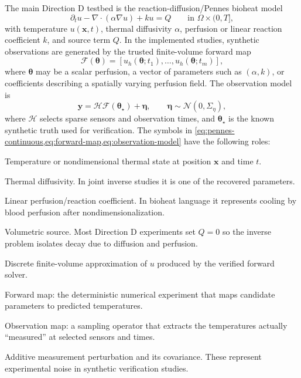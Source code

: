 \documentclass[11pt]{article}
\numberwithin{equation}{section}
\begin{document}
The main Direction D testbed is the reaction-diffusion/Pennes bioheat model
\begin{equation}
  \partial_t u - \nabla\cdot(\alpha\nabla u) + k u = Q
  \qquad \text{in } \Omega\times(0,T],
  \label{eq:pennes-continuous}
\end{equation}
with temperature $u(\bm{x},t)$, thermal diffusivity $\alpha$, perfusion or
linear reaction coefficient $k$, and source term $Q$.  In the implemented
studies, synthetic observations are generated by the trusted finite-volume
forward map
\begin{equation}
  \mathcal{F}(\bm{\theta}) =
  \left[u_h(\bm{\theta};t_1), \ldots, u_h(\bm{\theta};t_m)\right],
  \label{eq:forward-map}
\end{equation}
where $\bm{\theta}$ may be a scalar perfusion, a vector of parameters such as
$(\alpha,k)$, or coefficients describing a spatially varying perfusion field.
The observation model is
\begin{equation}
  \bm{y} = \mathcal{H}\mathcal{F}(\bm{\theta}_\star) + \bm{\eta},
  \qquad
  \bm{\eta}\sim \mathcal{N}(0,\Sigma_\eta),
  \label{eq:observation-model}
\end{equation}
where $\mathcal{H}$ selects sparse sensors and observation times, and
$\bm{\theta}_\star$ is the known synthetic truth used for verification.
The symbols in \cref{eq:pennes-continuous,eq:forward-map,eq:observation-model}
have the following roles:
\begin{description}[leftmargin=2.8cm,style=nextline]
  \item[$u(\bm{x},t)$] Temperature or nondimensional thermal state at position
  $\bm{x}$ and time $t$.
  \item[$\alpha$] Thermal diffusivity.  In joint inverse studies it is one of
  the recovered parameters.
  \item[$k$] Linear perfusion/reaction coefficient.  In bioheat language it
  represents cooling by blood perfusion after nondimensionalization.
  \item[$Q$] Volumetric source.  Most Direction D experiments set $Q=0$ so the
  inverse problem isolates decay due to diffusion and perfusion.
  \item[$u_h$] Discrete finite-volume approximation of $u$ produced by the
  verified forward solver.
  \item[$\mathcal{F}$] Forward map: the deterministic numerical experiment that
  maps candidate parameters to predicted temperatures.
  \item[$\mathcal{H}$] Observation map: a sampling operator that extracts the
  temperatures actually ``measured'' at selected sensors and times.
  \item[$\bm{\eta}$ and $\Sigma_\eta$] Additive measurement perturbation and its
  covariance.  These represent experimental noise in synthetic verification
  studies.
\end{description}
\end{document}
